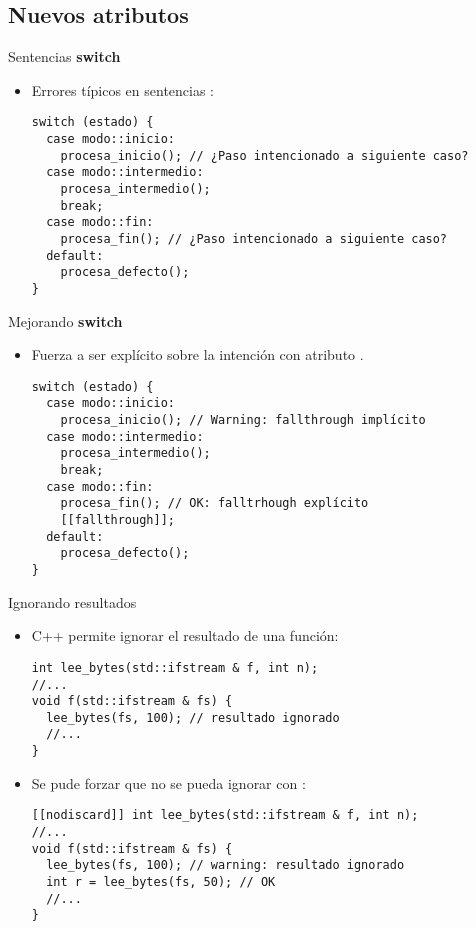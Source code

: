\subsection{Nuevos atributos}

\begin{frame}[t,fragile]{Sentencias {\bf switch}}
\begin{itemize}
  \item Errores típicos en sentencias :
\begin{lstlisting}
switch (estado) {
  case modo::inicio:
    procesa_inicio(); // ¿Paso intencionado a siguiente caso?
  case modo::intermedio:
    procesa_intermedio();
    break;
  case modo::fin:
    procesa_fin(); // ¿Paso intencionado a siguiente caso?
  default:
    procesa_defecto();
}
\end{lstlisting}
\end{itemize}
\end{frame}

\begin{frame}[t,fragile]{Mejorando {\bf switch}}
\begin{itemize}
  \item Fuerza a ser explícito sobre la intención con atributo \cppid{[[fallthrough]]}.
\begin{lstlisting}
switch (estado) {
  case modo::inicio:
    procesa_inicio(); // Warning: fallthrough implícito
  case modo::intermedio:
    procesa_intermedio();
    break;
  case modo::fin:
    procesa_fin(); // OK: falltrhough explícito
    [[fallthrough]];
  default:
    procesa_defecto();
}
\end{lstlisting}
\end{itemize}
\end{frame}

\begin{frame}[t,fragile]{Ignorando resultados}
\begin{itemize}
  \item C++ permite ignorar el resultado de una función:
\begin{lstlisting}
int lee_bytes(std::ifstream & f, int n);
//...
void f(std::ifstream & fs) {
  lee_bytes(fs, 100); // resultado ignorado
  //...
}
\end{lstlisting}

  \vfill\pause
  \item Se pude forzar que no se pueda ignorar con \cppkey{[[nodiscard]]}:
\begin{lstlisting}
[[nodiscard]] int lee_bytes(std::ifstream & f, int n);
//...
void f(std::ifstream & fs) {
  lee_bytes(fs, 100); // warning: resultado ignorado
  int r = lee_bytes(fs, 50); // OK
  //...
}
\end{lstlisting}

\end{itemize}
\end{frame}


